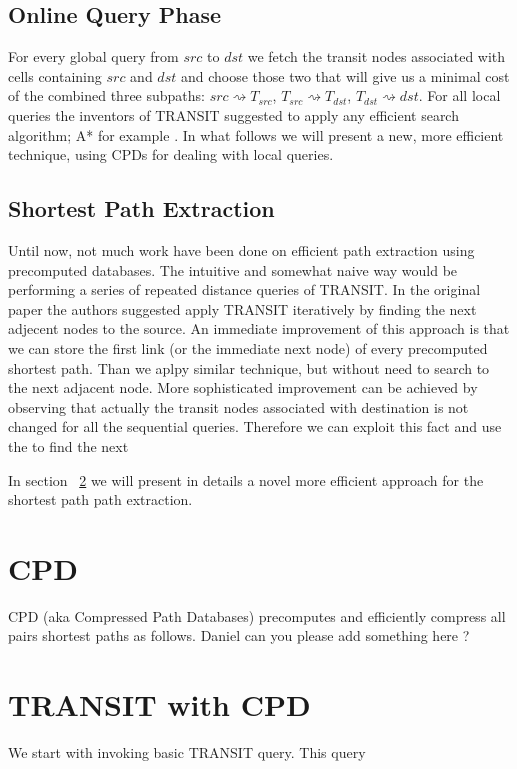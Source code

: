 \documentclass[runningheads,a4paper]{llncs}
\begin{document}
\subsection{Online Query Phase}
For every global query from $src$ to $dst$ we fetch the transit nodes associated with cells containing
$src$ and $dst$ and choose those two that will give us a minimal cost of the combined three subpaths:
$src \rightsquigarrow T_{src}$, $T_{src} \rightsquigarrow T_{dst}$, $T_{dst} \rightsquigarrow dst$.
For all local queries the inventors of TRANSIT suggested to apply any efficient search algorithm; A* for example \cite{bast06}.
In what follows we will present a new, more efficient technique, using CPDs for dealing with local queries.

\subsection{Shortest Path Extraction}
Until now, not much work have been done on efficient path extraction using precomputed databases.
The intuitive and somewhat naive way would be performing a series of repeated distance queries of TRANSIT.
In the original paper the authors suggested apply TRANSIT iteratively by finding the next adjecent nodes to the source. 
An immediate improvement of this approach is that we can store the first link (or the immediate next node) of every precomputed 
shortest path. Than we aplpy similar technique, but without need to search to the next adjacent node.
More sophisticated improvement can be achieved by observing that actually the transit nodes associated with destination 
is not changed for all the sequential queries. Therefore we can exploit this fact and use the 
to find the next 

In section ~\ref{sec:transit_cpd} we will present in details a novel more efficient approach for the shortest path path extraction.

\section{CPD}
CPD (aka Compressed Path Databases) precomputes and efficiently compress all pairs shortest paths as follows.
Daniel can you please add something here ?

\section{TRANSIT with CPD}\label{sec:transit_cpd}
We start with invoking basic TRANSIT query. This query 
\end{document}
